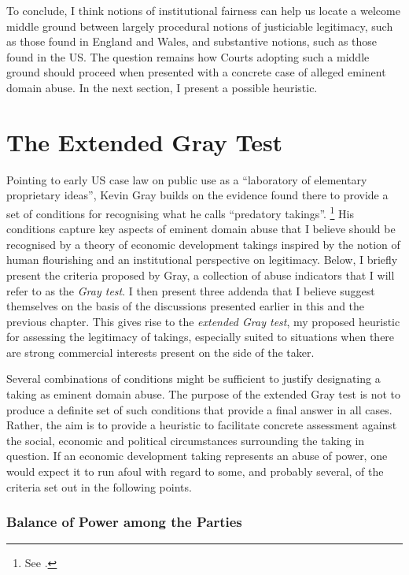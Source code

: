 To conclude, I think notions of institutional fairness can help us locate a welcome middle ground between largely procedural notions of justiciable legitimacy, such as those found in England and Wales, and substantive notions, such as those found in the US. The question remains how Courts adopting such a middle ground should proceed when presented with a concrete case of alleged eminent domain abuse. In the next section, I present a possible heuristic.

\section{The Extended Gray Test}\label{sec:3:5}

Pointing to early US case law on public use as a ``laboratory of elementary proprietary ideas'', Kevin Gray builds on the evidence found there to provide a set of conditions for recognising what he calls ``predatory takings''. \footnote{See \cite[28-30]{gray11}.} His conditions capture key aspects of eminent domain abuse that I believe should be recognised by a theory of economic development takings inspired by the notion of human flourishing and an institutional perspective on legitimacy. Below, I briefly present the criteria proposed by Gray, a collection of abuse indicators that I will refer to as the {\it Gray test}. I then present three addenda that I believe suggest themselves on the basis of the discussions presented earlier in this and the previous chapter. This gives rise to the {\it extended Gray test}, my proposed heuristic for assessing the legitimacy of takings, especially suited to situations when there are strong commercial interests present on the side of the taker.

Several combinations of conditions might be sufficient to justify designating a taking as eminent domain abuse. The purpose of the extended Gray test is not to produce a definite set of such conditions that provide a final answer in all cases. Rather, the aim is to provide a heuristic to facilitate concrete assessment against the social, economic and political circumstances surrounding the taking in question. If an economic development taking represents an abuse of power, one would expect it to run afoul with regard to some, and probably several, of the criteria set out in the following points.

\subsubsection*{Balance of Power among the Parties}

